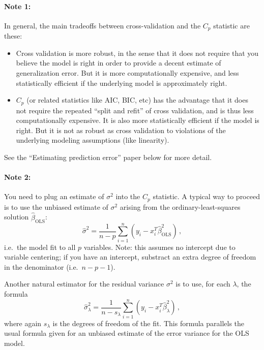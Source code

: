 \documentclass{article}
\begin{document}
\begin{enumerate}[label=(\Alph*)]
\paragraph{Note 1:} In general, the main tradeoffs between cross-validation and the $C_p$ statistic are these:
\begin{itemize}
\item  Cross validation is more robust, in the sense that it does not require that you believe the model is right in order to provide a decent estimate of generalization error.  But it is more computationally expensive, and less statistically efficient if the underlying model is approximately right.
\item $C_p$ (or related statistics like AIC, BIC, etc) has the advantage that it does not require the repeated ``split and refit'' of cross validation, and is thus less computationally expensive.  It is also more statistically efficient if the model is right.  But it is not as robust as cross validation to violations of the underlying modeling assumptions (like linearity).
\end{itemize}
See the ``Estimating prediction error'' paper below for more detail.

\paragraph{Note 2:} You need to plug an estimate of $\sigma^2$ into the $C_p$ statistic.  A typical way to proceed is to use the unbiased estimate of $\sigma^2$ arising from the ordinary-least-squares solution $\hat \beta_{\mathrm{OLS}}$:
$$
\hat{\sigma}^2 = \frac{1}{n - p} \sum_{i=1}^n (y_i - x_i^T \hat \beta_{\mathrm{OLS}}^2) \, ,
$$
i.e.~the model fit to all $p$ variables.  Note: this assumes no intercept due to variable centering; if you have an intercept, substract an extra degree of freedom in the denominator (i.e.~$n-p-1$).

Another natural estimator for the residual variance $\sigma^2$ is to use, for each $\lambda$, the formula
$$
\hat{\sigma}^2_{\lambda} = \frac{1}{n - s_{\lambda}} \sum_{i=1}^n (y_i - x_i^T \hat \beta_{\lambda}^2) \, ,
$$
where again $s_{\lambda}$ is the degrees of freedom of the fit.  This formula parallels the usual formula given for an unbiased estimate of the error variance for the OLS model.


\end{enumerate}
\end{document}
